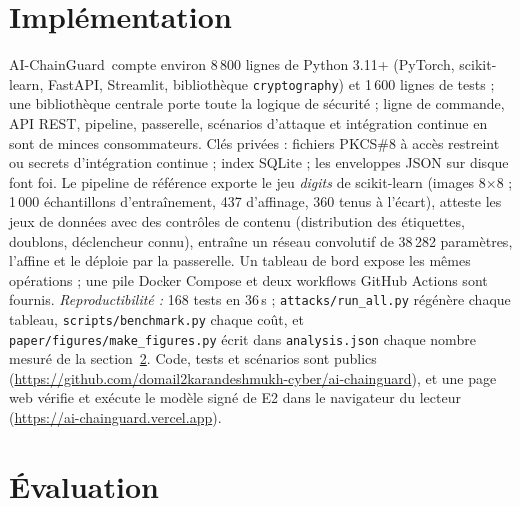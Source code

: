 \documentclass[conference]{IEEEtran}
\newcommand{\sys}{AI-ChainGuard}
\begin{document}
\section{Implémentation}\label{sec:impl}
\sys\ compte environ 8\,800 lignes de Python 3.11+ (PyTorch, scikit-learn, FastAPI, Streamlit, bibliothèque \texttt{cryptography}) et 1\,600 lignes de tests ; une bibliothèque centrale porte toute la logique de sécurité ; ligne de commande, API REST, pipeline, passerelle, scénarios d'attaque et intégration continue en sont de minces consommateurs. Clés privées : fichiers PKCS\#8 à accès restreint ou secrets d'intégration continue ; index SQLite ; les enveloppes JSON sur disque font foi. Le pipeline de référence exporte le jeu \emph{digits} de scikit-learn (images 8$\times$8 ; 1\,000 échantillons d'entraînement, 437 d'affinage, 360 tenus à l'écart), atteste les jeux de données avec des contrôles de contenu (distribution des étiquettes, doublons, déclencheur connu), entraîne un réseau convolutif de 38\,282 paramètres, l'affine et le déploie par la passerelle. Un tableau de bord expose les mêmes opérations ; une pile Docker Compose et deux workflows GitHub Actions sont fournis. \emph{Reproductibilité :} 168 tests en 36\,s ; \texttt{attacks/run\_all.py} régénère chaque tableau, \texttt{scripts/benchmark.py} chaque coût, et \texttt{paper/figures/make\_figures.py} écrit dans \texttt{analysis.json} chaque nombre mesuré de la section~\ref{sec:eval}. Code, tests et scénarios sont publics (\url{https://github.com/domail2karandeshmukh-cyber/ai-chainguard}), et une page web vérifie et exécute le modèle signé de E2 dans le navigateur du lecteur (\url{https://ai-chainguard.vercel.app}).

\section{Évaluation}\label{sec:eval}
\end{document}
